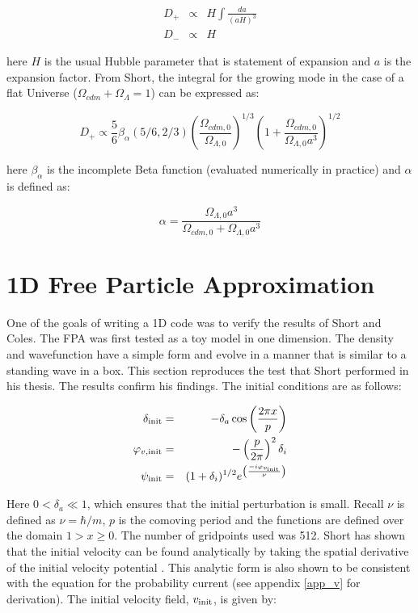 \begin{eqnarray}
D_+ &\propto& H \int \frac{da}{(aH)^3}\\
D_- &\propto& H
\end{eqnarray}

\noindent here $H$ is the usual Hubble parameter that is statement of expansion and $a$ is the expansion factor. From Short, the integral for the growing mode in the case of a flat Universe ($\Omega_{cdm} + \Omega_{\Lambda} = 1$) can be expressed as:

\begin{equation}
\label{lingro}
D_+ \propto \frac{5}{6} \beta_{\alpha}(5/6, 2/3) \left(\frac{\Omega_{cdm,0}}{\Omega_{\Lambda,0}} \right)^{1/3} \left(1+\frac{\Omega_{cdm,0}}{\Omega_{\Lambda,0}a^3} \right)^{1/2} 
\end{equation}

\noindent here $\beta_{\alpha}$ is the incomplete Beta function (evaluated numerically in practice) and $\alpha$ is defined as:

\begin{equation}
\alpha =  \frac {\Omega_{\Lambda,0}a^3}{\Omega_{cdm,0} + \Omega_{\Lambda,0}a^3}
\end{equation}


\section{1D Free Particle Approximation}
\label{1dpfa}
One of the goals of writing a 1D code was to verify the results of Short and Coles. The FPA was first tested as a toy model in one dimension. The density and wavefunction have a simple form and evolve in a manner that is similar to a standing wave in a box. This section reproduces the test that Short performed in his thesis. The results confirm his findings. The initial conditions are as follows:

\begin{eqnarray}
\label{inits_fpa}
\delta_{\rm init} &=& - \delta_a \cos\left(\frac{2 \pi x}{p} \right) \nonumber \\
\varphi_{v,\rm init} &=& -\left(\frac{p}{2 \pi} \right)^2 \delta_i \nonumber \\
\psi_{\rm init} &=& (1+ \delta_i)^{1/2}e^{\left(\frac{-i\varphi_{v_{\rm init}}}{\nu}\right)}
\end{eqnarray}

\noindent Here $0 < \delta_a \ll 1$, which ensures that the initial perturbation is small. Recall $\nu$ is defined as $\nu = \hbar/m$, $p$ is the comoving period and the functions are defined over the domain $ 1 > x \ge 0$. The number of gridpoints used was 512. Short has shown that the initial velocity can be found analytically by taking the spatial derivative of the initial velocity potential \citep{bib_sho}. This analytic form is also shown to be consistent with the equation for the probability current (see appendix \ref{app_v} for derivation). The initial velocity field, $v_{\rm init}$, is given by:

